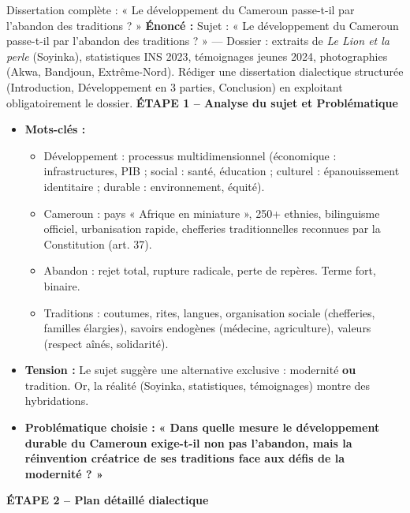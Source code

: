 \documentclass[11pt]{article}
\newcommand{\cle}[1]{{\popxbold\color{popdark}#1}}
\newcounter{popsec}
\newcounter{popsub}
\newcommand{\courssub}[1]{%
  \stepcounter{popsub}%
  \par\vspace{9pt}\noindent{\popxbold\fontsize{11.5}{13}\selectfont\color{popink}{\color{poporange}\thepopsec.\thepopsub}\hspace{6pt}#1}\par\nopagebreak\vspace{4pt}
}
\begin{document}
\courssub{Démarche et corrigé commenté}
\begin{exoresolu}{Dissertation complète : « Le développement du Cameroun passe-t-il par l'abandon des traditions ? »}
\textbf{Énoncé :} Sujet : « Le développement du Cameroun passe-t-il par l'abandon des traditions ? » — Dossier : extraits de \emph{Le Lion et la perle} (Soyinka), statistiques INS 2023, témoignages jeunes 2024, photographies (Akwa, Bandjoun, Extrême-Nord). Rédiger une dissertation dialectique structurée (Introduction, Développement en 3 parties, Conclusion) en exploitant obligatoirement le dossier.
\tcblower
\textbf{ÉTAPE 1 -- Analyse du sujet et Problématique}

\begin{itemize}
    \item \textbf{Mots-clés :} 
    \begin{itemize}
        \item \cle{Développement} : processus multidimensionnel (économique : infrastructures, PIB ; social : santé, éducation ; culturel : épanouissement identitaire ; durable : environnement, équité).
        \item \cle{Cameroun} : pays « Afrique en miniature », 250+ ethnies, bilinguisme officiel, urbanisation rapide, chefferies traditionnelles reconnues par la Constitution (art. 37).
        \item \cle{Abandon} : rejet total, rupture radicale, perte de repères. Terme fort, binaire.
        \item \cle{Traditions} : coutumes, rites, langues, organisation sociale (chefferies, familles élargies), savoirs endogènes (médecine, agriculture), valeurs (respect aînés, solidarité).
    \end{itemize}
    \item \textbf{Tension :} Le sujet suggère une alternative exclusive : modernité \textbf{ou} tradition. Or, la réalité (Soyinka, statistiques, témoignages) montre des hybridations.
    \item \textbf{Problématique choisie :} \textbf{« Dans quelle mesure le développement durable du Cameroun exige-t-il non pas l'abandon, mais la réinvention créatrice de ses traditions face aux défis de la modernité ? »}
\end{itemize}

\textbf{ÉTAPE 2 -- Plan détaillé dialectique}


\end{exoresolu}
\end{document}
